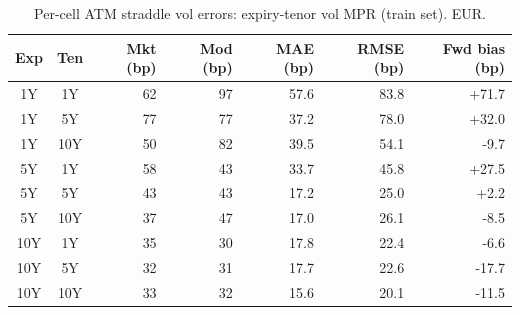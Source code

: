 \begin{table}[H]
\centering
\caption{Per-cell ATM straddle vol errors: expiry-tenor vol MPR (train set). EUR.}
\label{tab:expiry_tenor_vol_mpr_per_cell_train}
\small
\begin{tabular}{@{}ccrrrrr@{}}
\toprule
\textbf{Exp} & \textbf{Ten} & \textbf{Mkt (bp)} & \textbf{Mod (bp)} & \textbf{MAE (bp)} & \textbf{RMSE (bp)} & \textbf{Fwd bias (bp)} \\
\midrule
  1Y & 1Y & 62 & 97 & 57.6 & 83.8 & +71.7 \\
  1Y & 5Y & 77 & 77 & 37.2 & 78.0 & +32.0 \\
  1Y & 10Y & 50 & 82 & 39.5 & 54.1 & -9.7 \\
  \midrule
  5Y & 1Y & 58 & 43 & 33.7 & 45.8 & +27.5 \\
  5Y & 5Y & 43 & 43 & 17.2 & 25.0 & +2.2 \\
  5Y & 10Y & 37 & 47 & 17.0 & 26.1 & -8.5 \\
  \midrule
  10Y & 1Y & 35 & 30 & 17.8 & 22.4 & -6.6 \\
  10Y & 5Y & 32 & 31 & 17.7 & 22.6 & -17.7 \\
  10Y & 10Y & 33 & 32 & 15.6 & 20.1 & -11.5 \\
\bottomrule
\end{tabular}
\end{table}